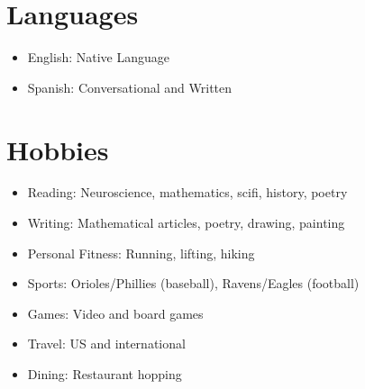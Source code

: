 \documentclass[11pt]{article}
\begin{document}
\section*{Languages}
\begin{itemize}[leftmargin=*]
    \item English: Native Language
    \item Spanish: Conversational and Written
\end{itemize}

\section*{Hobbies}
\begin{itemize}[leftmargin=*]
    \item Reading: Neuroscience, mathematics, scifi, history, poetry
    \item Writing: Mathematical articles, poetry, drawing, painting
    \item Personal Fitness: Running, lifting, hiking
    \item Sports: Orioles/Phillies (baseball), Ravens/Eagles (football)
    \item Games: Video and board games
    \item Travel: US and international
    \item Dining: Restaurant hopping
\end{itemize}
\end{document}
